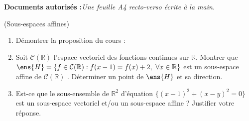 \documentclass[a4paper,12pt,reqno]{amsart}
\begin{document}
\ifsolutions\else
\textbf{Documents autorisés :}\textit{Une feuille A4 recto-verso écrite à la main.}

\tsvp

\vspace{7mm}
\fi

\begin{exo} (Sous-espaces affines)
  \begin{enumerate}
    \item Démontrer la proposition du cours :


    \smallskip

    \item Soit $\mathcal{C}(\mathbb{R})$ l'espace vectoriel des fonctions continues sur $\mathbb{R}$. Montrer que $\ens{H} = \{ f \in \mathcal{C}(\mathbb{R}) : f(x-1)=f(x)+2, \ \forall x \in \mathbb{R} \}$
  est un sous-espace affine de $\mathcal{C}(\mathbb{R})$ . Déterminer
  un point de $\ens{H}$ et sa direction.

    \item Est-ce que le sous-ensemble de $\mathbb{R}^{2}$ d'équation $\{(x-1)^{2}+(x-y)^{2}=0\}$ est un sous-espace vectoriel et/ou un sous-espace affine ? Justifier votre réponse.
  \end{enumerate}
\end{exo}
\end{document}
